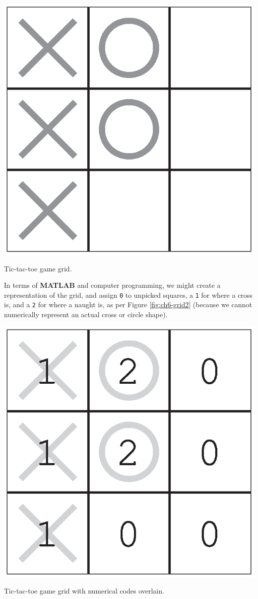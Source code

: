 \documentclass{tufte-book} %
\begin{document}
\begin{marginfigure}[-3.0in]
\includegraphics[width=\linewidth]{ch6-grid1.eps}
\caption{Tic-tac-toe game grid.}
\label{fig:ch6-grid1}
\end{marginfigure}

In terms of \textbf{MATLAB} and computer programming, we might create a representation of the grid, and assign \texttt{0} to unpicked squares, a \texttt{1} for where a cross is, and a \texttt{2} for where a naught is, as per Figure \ref{fig:ch6-grid2} (because we cannot numerically represent an actual cross or circle shape). 
\begin{marginfigure}[-0.50in]
\includegraphics[width=\linewidth]{ch6-grid2.eps}
\caption{Tic-tac-toe game grid with numerical codes overlain.}
\label{fig:ch6-grid2}
\end{marginfigure}
\end{document}
